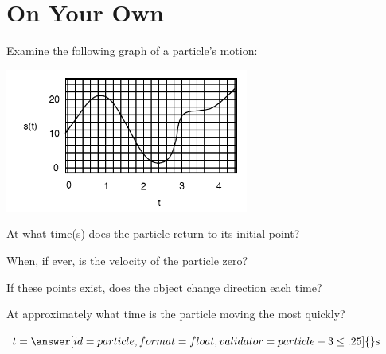 \documentclass{ximera}
\begin{document}
\section{On Your Own}
\begin{question}
Examine the following graph of a particle's motion:

\begin{image}
    \includegraphics[width=80mm]{position.png}
\end{image}

At what time(s) does the particle return to its initial point?

\begin{selectAll}
\end{selectAll}

When, if ever, is the velocity of the particle zero?

\begin{selectAll}
\end{selectAll}

If these points exist, does the object change direction each time?

\begin{multipleChoice}
\end{multipleChoice}

At approximately what time is the particle moving the most quickly?

$t = \answer[id=particle,format=float,validator=particle-3\leq .25]{} \text{s}$
\end{question}
\end{document}
